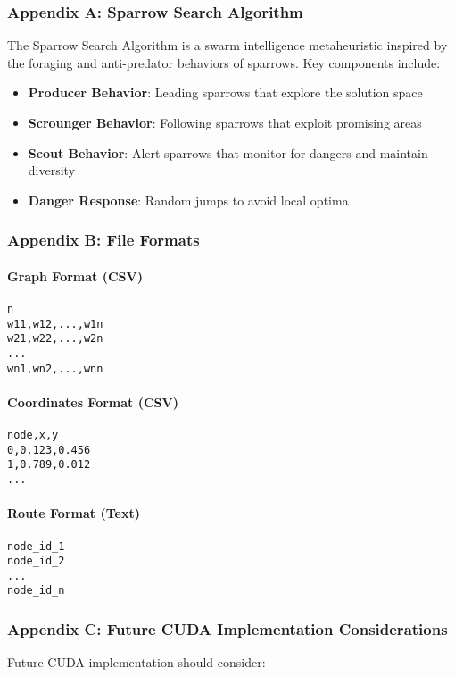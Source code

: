 \documentclass[conference]{IEEEtran}
\begin{document}
\subsubsection{Appendix A: Sparrow Search Algorithm}
The Sparrow Search Algorithm is a swarm intelligence metaheuristic inspired by the foraging and anti-predator behaviors of sparrows. Key components include:

\begin{itemize}
    \item \textbf{Producer Behavior}: Leading sparrows that explore the solution space
    \item \textbf{Scrounger Behavior}: Following sparrows that exploit promising areas
    \item \textbf{Scout Behavior}: Alert sparrows that monitor for dangers and maintain diversity
    \item \textbf{Danger Response}: Random jumps to avoid local optima
\end{itemize}

\subsubsection{Appendix B: File Formats}

\paragraph{Graph Format (CSV)}
\begin{verbatim}
n
w11,w12,...,w1n
w21,w22,...,w2n
...
wn1,wn2,...,wnn
\end{verbatim}

\paragraph{Coordinates Format (CSV)}
\begin{verbatim}
node,x,y
0,0.123,0.456
1,0.789,0.012
...
\end{verbatim}

\paragraph{Route Format (Text)}
\begin{verbatim}
node_id_1
node_id_2
...
node_id_n
\end{verbatim}

\subsubsection{Appendix C: Future CUDA Implementation Considerations}
Future CUDA implementation should consider:
\end{document}
